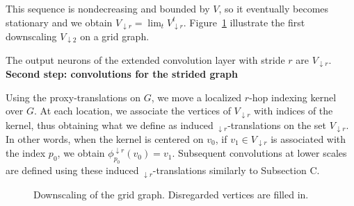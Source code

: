 This sequence is nondecreasing and bounded by $V$, so it eventually becomes stationary and we obtain $V_{\downarrow r} = \lim_t{V_{\downarrow r}^t}$. Figure~\ref{downscaling} illustrate the first downscaling $V_{\downarrow 2}$ on a grid graph. %

The output neurons of the extended convolution layer with stride $r$ are $V_{\downarrow r}$.\\

\noindent\textbf{Second step: convolutions for the strided graph}

Using the proxy-translations on $G$, we move a localized $r$-hop indexing kernel over $G$. At each location, we associate the vertices of $V_{\downarrow r}$ with indices of the kernel, thus obtaining what we define as induced $_{\downarrow r}$-translations on the set $V_{\downarrow r}$. In other words, when the kernel is centered on $v_0$, if $v_1 \in V_{\downarrow r}$ is associated with the index $p_0$, we obtain $\phi_{p_0}^{\downarrow r}(v_0) = v_1$. Subsequent convolutions at lower scales are defined using these induced $_{\downarrow r}$-translations similarly to Subsection C.



\begin{figure}[h!]
  \begin{center}
  \end{center}
  
  \caption{Downscaling of the grid graph. Disregarded vertices are filled in.}
  \label{downscaling}
\end{figure}

